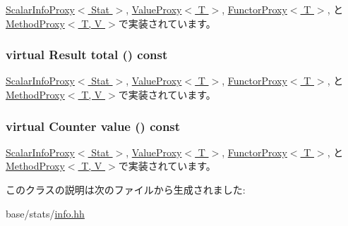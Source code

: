 \hyperlink{classStats_1_1ScalarInfoProxy_ae050da86c3d8e8a677a0bdeb7971e1e3}{ScalarInfoProxy$<$ Stat $>$}, \hyperlink{classStats_1_1ValueProxy_ae050da86c3d8e8a677a0bdeb7971e1e3}{ValueProxy$<$ T $>$}, \hyperlink{classStats_1_1FunctorProxy_ae050da86c3d8e8a677a0bdeb7971e1e3}{FunctorProxy$<$ T $>$}, と \hyperlink{classStats_1_1MethodProxy_ae050da86c3d8e8a677a0bdeb7971e1e3}{MethodProxy$<$ T, V $>$}で実装されています。\hypertarget{classStats_1_1ScalarInfo_ab152b7e89b37a7db03b04d500ceb8349}{
\subsubsection[{total}]{\setlength{\rightskip}{0pt plus 5cm}virtual {\bf Result} total () const}}
\label{classStats_1_1ScalarInfo_ab152b7e89b37a7db03b04d500ceb8349}


\hyperlink{classStats_1_1ScalarInfoProxy_a35c6e2ed3fc81b40d69052a062113ead}{ScalarInfoProxy$<$ Stat $>$}, \hyperlink{classStats_1_1ValueProxy_a35c6e2ed3fc81b40d69052a062113ead}{ValueProxy$<$ T $>$}, \hyperlink{classStats_1_1FunctorProxy_a35c6e2ed3fc81b40d69052a062113ead}{FunctorProxy$<$ T $>$}, と \hyperlink{classStats_1_1MethodProxy_a35c6e2ed3fc81b40d69052a062113ead}{MethodProxy$<$ T, V $>$}で実装されています。\hypertarget{classStats_1_1ScalarInfo_a1fb831559ad900460c4c9e4f546cd234}{
\subsubsection[{value}]{\setlength{\rightskip}{0pt plus 5cm}virtual {\bf Counter} value () const}}
\label{classStats_1_1ScalarInfo_a1fb831559ad900460c4c9e4f546cd234}


\hyperlink{classStats_1_1ScalarInfoProxy_aa9e486cb7eb0ad44f5f89923594b68a4}{ScalarInfoProxy$<$ Stat $>$}, \hyperlink{classStats_1_1ValueProxy_aa9e486cb7eb0ad44f5f89923594b68a4}{ValueProxy$<$ T $>$}, \hyperlink{classStats_1_1FunctorProxy_aa9e486cb7eb0ad44f5f89923594b68a4}{FunctorProxy$<$ T $>$}, と \hyperlink{classStats_1_1MethodProxy_aa9e486cb7eb0ad44f5f89923594b68a4}{MethodProxy$<$ T, V $>$}で実装されています。

このクラスの説明は次のファイルから生成されました:\begin{DoxyCompactItemize}
\item 
base/stats/\hyperlink{info_8hh}{info.hh}\end{DoxyCompactItemize}
